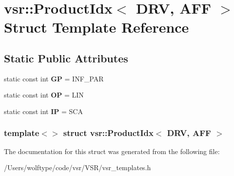 \hypertarget{structvsr_1_1_product_idx_3_01_d_r_v_00_01_a_f_f_01_4}{\section{vsr\-:\-:Product\-Idx$<$ D\-R\-V, A\-F\-F $>$ Struct Template Reference}
\label{structvsr_1_1_product_idx_3_01_d_r_v_00_01_a_f_f_01_4}
}
\subsection*{Static Public Attributes}
\begin{DoxyCompactItemize}
\item 
\hypertarget{structvsr_1_1_product_idx_3_01_d_r_v_00_01_a_f_f_01_4_a27136d14a9ef2edb96a94d14db70d7b1}{static const int {\bfseries G\-P} = I\-N\-F\-\_\-\-P\-A\-R}\label{structvsr_1_1_product_idx_3_01_d_r_v_00_01_a_f_f_01_4_a27136d14a9ef2edb96a94d14db70d7b1}

\item 
\hypertarget{structvsr_1_1_product_idx_3_01_d_r_v_00_01_a_f_f_01_4_a01de3c84958c918099f061a1c8384a12}{static const int {\bfseries O\-P} = L\-I\-N}\label{structvsr_1_1_product_idx_3_01_d_r_v_00_01_a_f_f_01_4_a01de3c84958c918099f061a1c8384a12}

\item 
\hypertarget{structvsr_1_1_product_idx_3_01_d_r_v_00_01_a_f_f_01_4_ae997e49e9ed5b3ef9856b95120b3d483}{static const int {\bfseries I\-P} = S\-C\-A}\label{structvsr_1_1_product_idx_3_01_d_r_v_00_01_a_f_f_01_4_ae997e49e9ed5b3ef9856b95120b3d483}

\end{DoxyCompactItemize}
\subsubsection*{template$<$$>$ struct vsr\-::\-Product\-Idx$<$ D\-R\-V, A\-F\-F $>$}



The documentation for this struct was generated from the following file\-:\begin{DoxyCompactItemize}
\item 
/\-Users/wolftype/code/vsr/\-V\-S\-R/vsr\-\_\-templates.\-h\end{DoxyCompactItemize}
